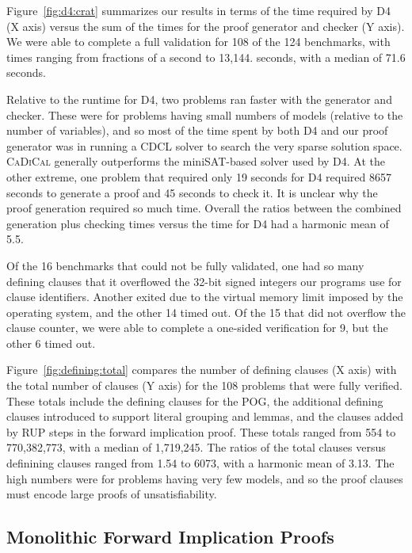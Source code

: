 \documentclass[letterpaper,USenglish,cleveref, autoref, thm-restate]{lipics-v2021}
\newcommand{\progname}[1]{\textsc{#1}}
\newcommand{\dfour}{\progname{D4}}
\newcommand{\cadical}{\progname{CaDiCal}}
\begin{document}
Figure~\ref{fig:d4:crat} summarizes our results in terms of the time
required by \dfour{} (X axis) versus the sum of the times for the
proof generator and checker (Y axis).
We were able to complete a full validation for 108 of the 124
benchmarks, with times ranging from fractions of a second to 13,144.
seconds, with a median of 71.6 seconds.

Relative to the runtime for \dfour{}, two problems ran faster
with the generator and checker.  These were for problems having small numbers of
models (relative to the number of variables), and so most of the time
spent by both \dfour{} and our proof generator was in running a CDCL
solver to search the very sparse solution space.
\cadical{} generally outperforms the miniSAT-based solver used by
\dfour{}.  At the other extreme, one problem that required only 19
seconds for \dfour{} required 8657 seconds to generate a proof and 45
seconds to check it.  It is unclear why the proof generation required
so much time.  Overall the ratios between the combined generation plus
checking times versus the time for \dfour{} had a harmonic mean of
5.5.

Of the 16 benchmarks that could not be fully validated, one had so
many defining clauses that it overflowed the 32-bit signed integers
our programs use for clause identifiers.  Another exited due to the
virtual memory limit imposed by the operating system, and the
other 14 timed out.  Of the 15 that did not overflow the clause
counter, we were able to complete a one-sided verification for 9, but
the other 6 timed out.



Figure~\ref{fig:defining:total} compares the number of defining
clauses (X axis) with the total number of clauses (Y axis) for the 108
problems that were fully verified.  These totals include the defining
clauses for the POG, the additional defining clauses introduced to
support literal grouping and lemmas, and the clauses added by RUP
steps in the forward implication proof.  These totals ranged from 554
to 770,382,773, with a median of 1,719,245.  The ratios of the total
clauses versus definining clauses ranged from 1.54 to 6073, with a
harmonic mean of 3.13.  The high numbers were for problems having very
few models, and so the proof clauses must encode large proofs of
unsatisfiability.

\subsection{Monolithic Forward Implication Proofs}
\label{app:experiment:monolithic}
\end{document}
